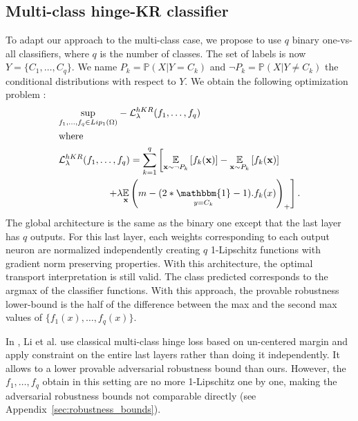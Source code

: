 \subsection{Multi-class hinge-KR classifier}
To adapt our approach to the multi-class case, we propose to use $q$ binary one-vs-all classifiers, where $q$ is the number of classes. The set of labels is now $Y=\{C_1,\ldots,C_q\}$. We name $P_k=\mathbb{P}(X|Y= C_k)$ and $\neg P_k=\mathbb{P}(X|Y\not = C_k)$ the  conditional  distributions  with  respect  to  $Y$. We obtain the following optimization problem :
\begin{equation}
\label{eq:hkr_multi}
\begin{split}
&\underset{f_1,\ldots,f_q \in Lip_1(\Omega)}{\text{sup}}-\mathcal{L}^{hKR}_\lambda(f_1,\ldots,f_q) \\
&\text{where}\\
&\mathcal{L}^{hKR}_\lambda(f_1,\ldots,f_q) = \sum_{k=1}^q \left[\underset{\textbf{x}  \sim \neg P_k}{\mathbb{E}} \left[f_k(\textbf{x})\right] -\underset{\textbf{x} \sim P_k}{\mathbb{E}}\left[f_k(\textbf{x})\right] \right.\\ 
 & \left. \quad \quad \quad \quad \quad +\lambda\underset{\textbf{x}}{\mathbb{E}} \left(m-(2*\underset{y=C_k}{\mathbbm{1}} -1).f_k(x)  \right)_+ \right].
\end{split}
\end{equation}
The global architecture is the same as the binary one except that the last layer has $q$ outputs. For this last layer, each weights corresponding to each output neuron are normalized independently creating $q$ 1-Lipschitz functions with gradient norm preserving properties. With this architecture, the optimal transport interpretation is still valid. The class predicted corresponds to the argmax of the classifier functions. With this approach, the provable robustness lower-bound is the half of the difference between the max and the second max values of $\{f_1(x),\ldots,f_q(x)\}$.  

In \cite{li2019preventing}, Li et al. use classical multi-class hinge loss based on un-centered margin and apply constraint on the entire last layers rather than doing it independently. It allows to a lower provable adversarial robustness bound than ours. However, the $f_1,\ldots,f_q$ obtain in this setting are no more 1-Lipschitz one by one, making the adversarial robustness bounds not comparable directly (see Appendix~\ref{sec:robustness_bounds}).